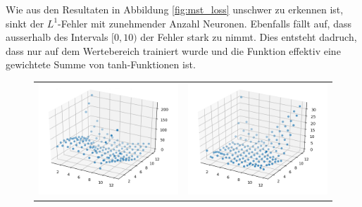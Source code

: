 Wie aus den Resultaten in Abbildung \ref{fig:mst_loss} unschwer zu
erkennen ist, sinkt der $L^1$-Fehler mit zunehmender Anzahl Neuronen.
Ebenfalls fällt auf, dass ausserhalb des Intervals $[0, 10)$ der
Fehler stark zu nimmt. Dies entsteht dadruch, dass nur auf dem
Wertebereich trainiert wurde und die Funktion effektiv eine gewichtete
Summe von tanh-Funktionen ist.
\begin{figure}
	\centering
	\begin{tabular}{cc}
		\includegraphics[scale=0.4]{learning/img/abs_plot_2_clean.png} &
		\includegraphics[scale=0.4]{learning/img/abs_plot_6_clean.png} \\

\end{tabular}
\end{figure}
